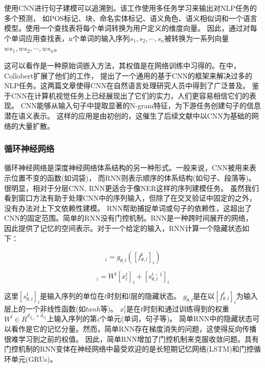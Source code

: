使用CNN进行句子建模可以追溯到\parencite{collobert2008unified}。该工作使用多任务学习来输出对NLP任务的多个预测，
如POS标记、块、命名实体标记、语义角色、语义相似词和一个语言模型。使用一个查找表将每个单词转换为用户定义的维度向量。
因此，通过对每个单词应用查找表，n个单词的输入序列$s_1,s_2,\cdots, s_n$被转换为一系列向量$ws_1,ws_2, \cdots, ws_n$。


这可以看作是一种原始词嵌入方法，其权值是在网络训练中习得的。在\parencite{collobert2011natural}中，Collobert扩展了他们的工作，
提出了一个通用的基于CNN的框架来解决过多的NLP任务。这两篇文章使得CNN在自然语言处理研究人员中得到了广泛普及。
鉴于CNN在计算机视觉任务上已经展现出了它们的实力，人们更容易相信它们的表现。
CNN能够从输入句子中提取显著的N-gram特征，为下游任务创建句子的信息潜在语义表示。
这样的应用是由\parencite{collobert2011natural, kim2016character, kalchbrenner2014convolutional}初创的，这催生了后续文献中以CNN为基础的网络的大量扩散。

\subsubsection{循环神经网络}


循环神经网络是深度神经网络体系结构的另一种形式。一般来说，CNN被用来表示位置不变的函数(如词袋)，
而RNN则表示顺序的体系结构(如句子、段落等)。很明显，相对于分层CNN, RNN更适合于像NER这样的序列建模任务。
虽然我们看到窗口方法有助于处理CNN中的序列输入，但除了在交叉验证中固定的之外，没有办法对上下文依赖性建模。
RNN帮助捕捉单词或句子的依赖性，这超出了CNN的固定范围。简单的RNN没有门控机制。RNN是一种跨时间展开的网络，
因此提供了记忆的空间表示。对于一个给定的输入，RNN计算一个隐藏状态如下：

\begin{equation}
	[s^t_{\theta, l}]_i = g_{\theta, l}([f^t_{\theta, l}]_i)
\end{equation}

\begin{equation}
	[f^t_{\theta, l}]_i = W^l[x^t_l]_i + [s^{t-1}_{\theta, l}]_i
\end{equation}

这里$[s^t_{\theta, l}]_i$是输入序列的单位在$t$时刻和$l$层的隐藏状态。
$g_{\theta, l}$是在以$[f^t_{\theta, l}]_i$为输入层上的一个非线性函数(如$tanh$等)。
$x^t_l$是在$t$时刻和通过训练得到的权重$W^l \in R^{d_{s^{t}_{\theta, l}} \times d_{x^t_l}}$上输入序列的第$i$个单元(单词，句子等)。
简单RNN中的隐藏状态可以看作是它的记忆分量。然而，简单RNN存在梯度消失的问题，这使得反向传播很难学习到之前的权值。
因此，简单RNN增加了门控机制来克服收敛问题。具有门控机制的RNN变体在神经网络中最受欢迎的是长短期记忆网络(LSTM)和门控循环单元(GRUs)。


